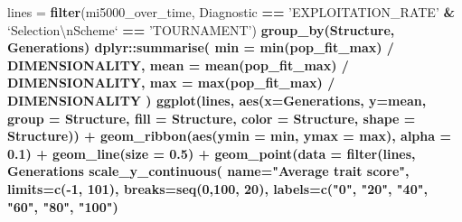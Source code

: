 \documentclass[]{book}
\newenvironment{Shaded}{\begin{snugshade}}{\end{snugshade}}
\newcommand{\CharTok}[1]{\textcolor[rgb]{0.31,0.60,0.02}{#1}}
\newcommand{\DataTypeTok}[1]{\textcolor[rgb]{0.13,0.29,0.53}{#1}}
\newcommand{\DecValTok}[1]{\textcolor[rgb]{0.00,0.00,0.81}{#1}}
\newcommand{\FloatTok}[1]{\textcolor[rgb]{0.00,0.00,0.81}{#1}}
\newcommand{\KeywordTok}[1]{\textcolor[rgb]{0.13,0.29,0.53}{\textbf{#1}}}
\newcommand{\NormalTok}[1]{#1}
\newcommand{\OperatorTok}[1]{\textcolor[rgb]{0.81,0.36,0.00}{\textbf{#1}}}
\newcommand{\StringTok}[1]{\textcolor[rgb]{0.31,0.60,0.02}{#1}}
\begin{document}
\begin{Shaded}
\begin{Highlighting}[]
\NormalTok{lines =}\StringTok{ }\KeywordTok{filter}\NormalTok{(mi5000_over_time, Diagnostic }\OperatorTok{==}\StringTok{ 'EXPLOITATION_RATE'} \OperatorTok{&}\StringTok{ `}\DataTypeTok{Selection}\CharTok{\textbackslash{}n}\DataTypeTok{Scheme}\StringTok{`} \OperatorTok{==}\StringTok{ 'TOURNAMENT'}\NormalTok{) }\OperatorTok{%>%}
\StringTok{  }\KeywordTok{group_by}\NormalTok{(Structure, Generations) }\OperatorTok{%>%}
\StringTok{  }\NormalTok{dplyr}\OperatorTok{::}\KeywordTok{summarise}\NormalTok{(}
    \DataTypeTok{min =} \KeywordTok{min}\NormalTok{(pop_fit_max) }\OperatorTok{/}\StringTok{ }\NormalTok{DIMENSIONALITY,}
    \DataTypeTok{mean =} \KeywordTok{mean}\NormalTok{(pop_fit_max) }\OperatorTok{/}\StringTok{ }\NormalTok{DIMENSIONALITY,}
    \DataTypeTok{max =} \KeywordTok{max}\NormalTok{(pop_fit_max) }\OperatorTok{/}\StringTok{ }\NormalTok{DIMENSIONALITY}
\NormalTok{  )}
\KeywordTok{ggplot}\NormalTok{(lines, }\KeywordTok{aes}\NormalTok{(}\DataTypeTok{x=}\NormalTok{Generations, }\DataTypeTok{y=}\NormalTok{mean, }\DataTypeTok{group =}\NormalTok{ Structure, }\DataTypeTok{fill =}\NormalTok{ Structure, }\DataTypeTok{color =}\NormalTok{ Structure, }\DataTypeTok{shape =}\NormalTok{ Structure)) }\OperatorTok{+}
\StringTok{  }\KeywordTok{geom_ribbon}\NormalTok{(}\KeywordTok{aes}\NormalTok{(}\DataTypeTok{ymin =}\NormalTok{ min, }\DataTypeTok{ymax =}\NormalTok{ max), }\DataTypeTok{alpha =} \FloatTok{0.1}\NormalTok{) }\OperatorTok{+}
\StringTok{  }\KeywordTok{geom_line}\NormalTok{(}\DataTypeTok{size =} \FloatTok{0.5}\NormalTok{) }\OperatorTok{+}
\StringTok{  }\KeywordTok{geom_point}\NormalTok{(}\DataTypeTok{data =} \KeywordTok{filter}\NormalTok{(lines, Generations }\OperatorTok{%%}\StringTok{ }\DecValTok{2000} \OperatorTok{==}\StringTok{ }\DecValTok{0}\NormalTok{), }\DataTypeTok{size =} \FloatTok{2.5}\NormalTok{, }\DataTypeTok{stroke =} \FloatTok{2.0}\NormalTok{, }\DataTypeTok{alpha =} \FloatTok{1.0}\NormalTok{) }\OperatorTok{+}
\StringTok{  }\KeywordTok{scale_y_continuous}\NormalTok{(}
    \DataTypeTok{name=}\StringTok{"Average trait score"}\NormalTok{,}
    \DataTypeTok{limits=}\KeywordTok{c}\NormalTok{(}\OperatorTok{-}\DecValTok{1}\NormalTok{, }\DecValTok{101}\NormalTok{),}
    \DataTypeTok{breaks=}\KeywordTok{seq}\NormalTok{(}\DecValTok{0}\NormalTok{,}\DecValTok{100}\NormalTok{, }\DecValTok{20}\NormalTok{),}
    \DataTypeTok{labels=}\KeywordTok{c}\NormalTok{(}\StringTok{"0"}\NormalTok{, }\StringTok{"20"}\NormalTok{, }\StringTok{"40"}\NormalTok{, }\StringTok{"60"}\NormalTok{, }\StringTok{"80"}\NormalTok{, }\StringTok{"100"}\NormalTok{)}
}}}
\end{Highlighting}
\end{Shaded}
\end{document}
